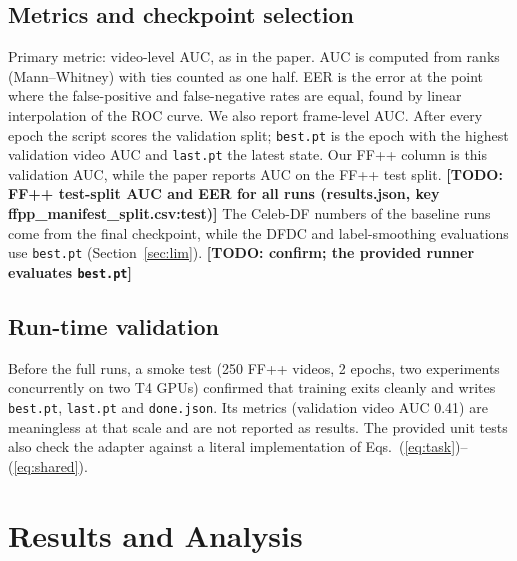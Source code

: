 \documentclass[lettersize,journal]{IEEEtran}
\newcommand{\todo}[1]{\textbf{[TODO: #1]}}
\begin{document}
\subsection{Metrics and checkpoint selection}
Primary metric: video-level AUC, as in the paper. AUC is computed from ranks (Mann--Whitney) with ties counted as one half. EER is the error at the point where the false-positive and false-negative rates are equal, found by linear interpolation of the ROC curve. We also report frame-level AUC. After every epoch the script scores the validation split; \texttt{best.pt} is the epoch with the highest validation video AUC and \texttt{last.pt} the latest state. Our FF++ column is this validation AUC, while the paper reports AUC on the FF++ test split. \todo{FF++ test-split AUC and EER for all runs (results.json, key ffpp\_manifest\_split.csv:test)} The Celeb-DF numbers of the baseline runs come from the final checkpoint, while the DFDC and label-smoothing evaluations use \texttt{best.pt} (Section~\ref{sec:lim}). \todo{confirm; the provided runner evaluates \texttt{best.pt}}

\subsection{Run-time validation}
Before the full runs, a smoke test (250 FF++ videos, 2 epochs, two experiments concurrently on two T4 GPUs) confirmed that training exits cleanly and writes \texttt{best.pt}, \texttt{last.pt} and \texttt{done.json}. Its metrics (validation video AUC 0.41) are meaningless at that scale and are not reported as results. The provided unit tests also check the adapter against a literal implementation of Eqs.~(\ref{eq:task})--(\ref{eq:shared}).

\section{Results and Analysis}
\end{document}
